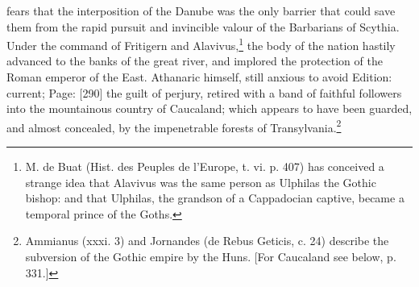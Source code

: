 fears that the interposition of the Danube was the only barrier that could save them from the rapid pursuit and invincible valour of the Barbarians of Scythia. Under the command of Fritigern and Alavivus,\footnote{M. de Buat (Hist. des Peuples de l\texthebrew{}’Europe, t. vi. p. 407) has conceived a strange idea that Alavivus was the same person as Ulphilas the Gothic bishop: and that Ulphilas, the grandson of a Cappadocian captive, became a temporal prince of the Goths.} the body of the nation hastily advanced to the banks of the great river, and implored the protection of the Roman emperor of the East. Athanaric himself, still anxious to avoid Edition: current; Page: [290] the guilt of perjury, retired with a band of faithful followers into the mountainous country of Caucaland; which appears to have been guarded, and almost concealed, by the impenetrable forests of Transylvania.\footnote{Ammianus (xxxi. 3) and Jornandes (de Rebus Geticis, c. 24) describe the subversion of the Gothic empire by the Huns. [For Caucaland see below, p. 331.]}

